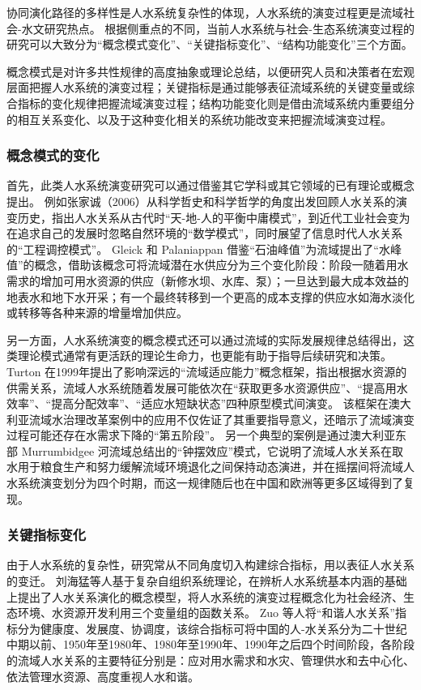 协同演化路径的多样性是人水系统复杂性的体现，人水系统的演变过程更是流域社会-水文研究热点。
根据侧重点的不同，当前人水系统与社会-生态系统演变过程的研究可以大致分为“概念模式变化”、“关键指标变化”、“结构功能变化”三个方面。

概念模式是对许多共性规律的高度抽象或理论总结，以便研究人员和决策者在宏观层面把握人水系统的演变过程；关键指标是通过能够表征流域系统的关键变量或综合指标的变化规律把握流域演变过程；结构功能变化则是借由流域系统内重要组分的相互关系变化、以及于这种变化相关的系统功能改变来把握流域演变过程。

\subsubsection*{概念模式的变化}

首先，此类人水系统演变研究可以通过借鉴其它学科或其它领域的已有理论或概念提出。
例如张家诚（2006）从科学哲史和科学哲学的角度出发回顾人水关系的演变历史，指出人水关系从古代时“天-地-人的平衡中庸模式”，到近代工业社会变为在追求自己的发展时忽略自然环境的“数学模式”，同时展望了信息时代人水关系的“工程调控模式”\cite{zhang2006}。
Gleick 和 Palaniappan 借鉴“石油峰值”为流域提出了“水峰值”的概念，借助该概念可将流域潜在水供应分为三个变化阶段：阶段一随着用水需求的增加可用水资源的供应（新修水坝、水库、泵）；一旦达到最大成本效益的地表水和地下水开采；有一个最终转移到一个更高的成本支撑的供应水如海水淡化或转移等各种来源的增量增加供应\cite{gleick2010}。

另一方面，人水系统演变的概念模式还可以通过流域的实际发展规律总结得出，这类理论模式通常有更活跃的理论生命力，也更能有助于指导后续研究和决策。
Turton 在1999年提出了影响深远的“流域适应能力”概念框架，指出根据水资源的供需关系，流域人水系统随着发展可能依次在“获取更多水资源供应”、“提高用水效率”、“提高分配效率”、“适应水短缺状态”四种原型模式间演变\cite{turton1999}。
该框架在澳大利亚流域水治理改革案例中的应用不仅佐证了其重要指导意义，还暗示了流域演变过程可能还存在水需求下降的“第五阶段”\cite{loch2020}。
另一个典型的案例是通过澳大利亚东部 Murrumbidgee 河流域总结出的“钟摆效应”模式，它说明了流域人水关系在取水用于粮食生产和努力缓解流域环境退化之间保持动态演进，并在摇摆间将流域人水系统演变划分为四个时期\cite{kandasamy2014, roobavannan2017}，而这一规律随后也在中国和欧洲等更多区域得到了复现\cite{han2017, mostert2018}。

\subsubsection*{关键指标变化}

由于人水系统的复杂性，研究常从不同角度切入构建综合指标，用以表征人水关系的变迁。
刘海猛等人基于复杂自组织系统理论，在辨析人水系统基本内涵的基础上提出了人水关系演化的概念模型，将人水系统的演变过程概念化为社会经济、生态环境、水资源开发利用三个变量组的函数关系\cite{liu2014}。
Zuo 等人将“和谐人水关系”指标分为健康度、发展度、协调度\cite{zuo2008}，该综合指标可将中国的人-水关系分为二十世纪中期以前、1950年至1980年、1980年至1990年、1990年之后四个时间阶段，各阶段的流域人水关系的主要特征分别是：应对用水需求和水灾、管理供水和去中心化、依法管理水资源、高度重视人水和谐\cite{zuo2016a}。

